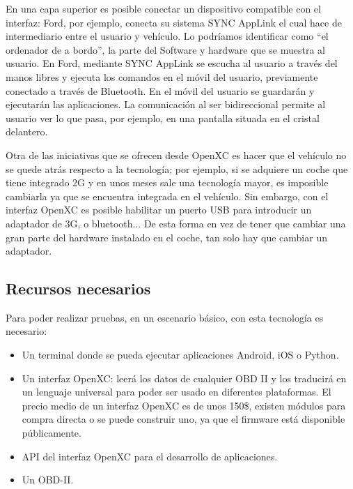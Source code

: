 En una capa superior es posible conectar un dispositivo compatible con el interfaz: Ford, por
ejemplo, conecta su sistema SYNC AppLink el cual hace de intermediario entre el usuario y
vehículo. Lo podríamos identificar como “el ordenador de a bordo”, la parte del Software
y hardware que se muestra al usuario. En Ford, mediante SYNC AppLink se escucha al usuario
a través del manos libres y ejecuta los comandos en el móvil del usuario, previamente
conectado a través de Bluetooth. En el móvil del usuario se guardarán y ejecutarán las
aplicaciones. La comunicación al ser bidireccional permite al usuario ver lo que pasa, por
ejemplo, en una pantalla situada en el cristal delantero.

Otra de las iniciativas que se ofrecen desde OpenXC es hacer que el vehículo no se quede atrás
respecto a la tecnología; por ejemplo, si se adquiere un coche que tiene integrado 2G y en unos
meses sale una tecnología mayor, es imposible cambiarla ya que se encuentra integrada en
el vehículo. Sin embargo, con el interfaz OpenXC es posible habilitar un puerto USB para
introducir un adaptador de 3G, o bluetooth... De esta forma en vez de tener que cambiar una
gran parte del hardware instalado en el coche, tan solo hay que cambiar un adaptador.

\subsection{Recursos necesarios}
Para poder realizar pruebas, en un escenario básico, con esta tecnología es necesario:

\begin{itemize}
	\item Un terminal donde se pueda ejecutar aplicaciones Android, iOS o Python.

	\item Un interfaz OpenXC: leerá los datos de cualquier OBD II y los traducirá en un
	 lenguaje universal para poder ser usado en diferentes plataformas. El precio medio
	 de un interfaz OpenXC es de unos 150\$, existen módulos para compra directa o se
	 puede construir uno, ya que el firmware está disponible públicamente.

	\item API del interfaz OpenXC para el desarrollo de aplicaciones.
	
	\item Un OBD-II.
\end{itemize}